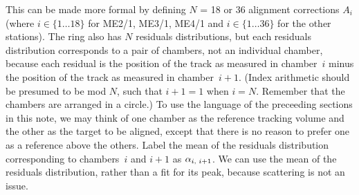 \documentclass[12pt]{article}
\begin{document}
This can be made more formal by defining $N$ = 18 or 36 alignment
corrections $A_i$ (where $i \in \{1\ldots 18\}$ for ME2/1, ME3/1,
ME4/1 and $i \in \{1\ldots 36\}$ for the other stations).  The ring
also has $N$ residuals distributions, but each residuals distribution
corresponds to a pair of chambers, not an individual chamber, because
each residual is the position of the track as measured in chamber~$i$
minus the position of the track as measured in chamber~$i+1$.  (Index
arithmetic should be presumed to be mod $N$, such that $i+1=1$ when
$i=N$.  Remember that the chambers are arranged in a circle.)  To use
the language of the preceeding sections in this note, we may think of
one chamber as the reference tracking volume and the other as the
target to be aligned, except that there is no reason to prefer one as
a reference above the others.  Label the mean of the residuals
distribution corresponding to chambers~$i$ and $i+1$ as
$\alpha_{i\mbox{\scriptsize, }i+1}$.  We can use the mean of the
residuals distribution, rather than a fit for its peak, because
scattering is not an issue.
\end{document}
